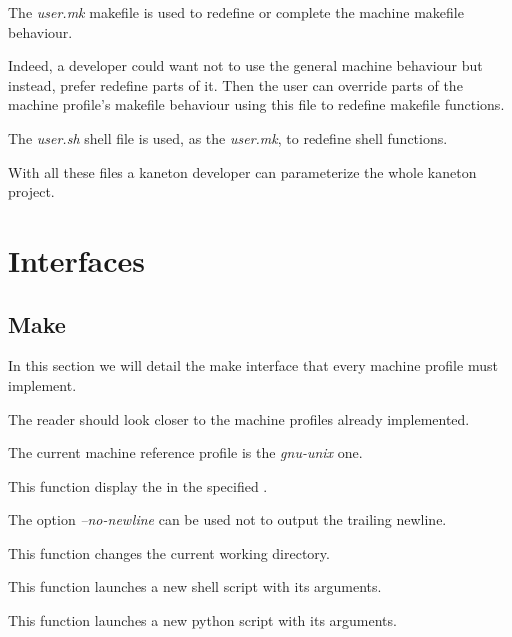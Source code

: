 The \textit{user.mk} makefile is used to redefine or complete the machine
makefile behaviour.

Indeed, a developer could want not to use the general machine behaviour but
instead, prefer redefine parts of it. Then the user can override parts of
the machine profile's makefile behaviour using this file to redefine makefile
functions.

The \textit{user.sh} shell file is used, as the \textit{user.mk}, to
redefine shell functions.

With all these files a kaneton developer can parameterize the whole
kaneton project.

%
%

\section{Interfaces}

%
%

\subsection{Make}

In this section we will detail the make interface that every machine
profile must implement.

The reader should look closer to the machine profiles already implemented.

The current machine reference profile is the \textit{gnu-unix} one.

         {
	   This function display the  in the specified
	   .

	   The option \textit{--no-newline} can be used not to output
	   the trailing newline.
	 }

         {
	   This function changes the current working directory.
	 }

         {
	   This function launches a new shell script with its arguments.
	 }

         {
	   This function launches a new python script with its arguments.
	 }

